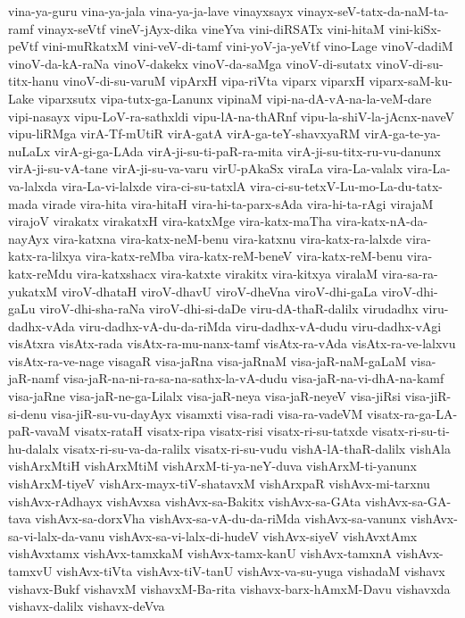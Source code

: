 {vina-ya-guru
vina-ya-jala
vina-ya-ja-lave
vinayxsayx
vinayx-seV-tatx-da-naM-ta-ramf
vinayx-seVtf
vineV-jAyx-dika
vineYva
vini-diRSATx
vini-hitaM
vini-kiSx-peVtf
vini-muRkatxM
vini-veV-di-tamf
vini-yoV-ja-yeVtf
vino-Lage
vinoV-dadiM
vinoV-da-kA-raNa
vinoV-dakekx
vinoV-da-saMga
vinoV-di-sutatx
vinoV-di-su-titx-hanu
vinoV-di-su-varuM
vipArxH
vipa-riVta
viparx
viparxH
viparx-saM-ku-Lake
viparxsutx
vipa-tutx-ga-Lanunx
vipinaM
vipi-na-dA-vA-na-la-veM-dare
vipi-nasayx
vipu-LoV-ra-sathxldi
vipu-lA-na-thARnf
vipu-la-shiV-la-jAcnx-naveV
vipu-liRMga
virA-Tf-mUtiR
virA-gatA
virA-ga-teY-shavxyaRM
virA-ga-te-ya-nuLaLx
virA-gi-ga-LAda
virA-ji-su-ti-paR-ra-mita
virA-ji-su-titx-ru-vu-danunx
virA-ji-su-vA-tane
virA-ji-su-va-varu
virU-pAkaSx
viraLa
vira-La-valalx
vira-La-va-lalxda
vira-La-vi-lalxde
vira-ci-su-tatxlA
vira-ci-su-tetxV-Lu-mo-La-du-tatx-mada
virade
vira-hita
vira-hitaH
vira-hi-ta-parx-sAda
vira-hi-ta-rAgi
virajaM
virajoV
virakatx
virakatxH
vira-katxMge
vira-katx-maTha
vira-katx-nA-da-nayAyx
vira-katxna
vira-katx-neM-benu
vira-katxnu
vira-katx-ra-lalxde
vira-katx-ra-lilxya
vira-katx-reMba
vira-katx-reM-beneV
vira-katx-reM-benu
vira-katx-reMdu
vira-katxshacx
vira-katxte
virakitx
vira-kitxya
viralaM
vira-sa-ra-yukatxM
viroV-dhataH
viroV-dhavU
viroV-dheVna
viroV-dhi-gaLa
viroV-dhi-gaLu
viroV-dhi-sha-raNa
viroV-dhi-si-daDe
viru-dA-thaR-dalilx
virudadhx
viru-dadhx-vAda
viru-dadhx-vA-du-da-riMda
viru-dadhx-vA-dudu
viru-dadhx-vAgi
visAtxra
visAtx-rada
visAtx-ra-mu-nanx-tamf
visAtx-ra-vAda
visAtx-ra-ve-lalxvu
visAtx-ra-ve-nage
visagaR
visa-jaRna
visa-jaRnaM
visa-jaR-naM-gaLaM
visa-jaR-namf
visa-jaR-na-ni-ra-sa-na-sathx-la-vA-dudu
visa-jaR-na-vi-dhA-na-kamf
visa-jaRne
visa-jaR-ne-ga-Lilalx
visa-jaR-neya
visa-jaR-neyeV
visa-jiRsi
visa-jiR-si-denu
visa-jiR-su-vu-dayAyx
visamxti
visa-radi
visa-ra-vadeVM
visatx-ra-ga-LA-paR-vavaM
visatx-rataH
visatx-ripa
visatx-risi
visatx-ri-su-tatxde
visatx-ri-su-ti-hu-dalalx
visatx-ri-su-va-da-ralilx
visatx-ri-su-vudu
vishA-lA-thaR-dalilx
vishAla
vishArxMtiH
vishArxMtiM
vishArxM-ti-ya-neY-duva
vishArxM-ti-yanunx
vishArxM-tiyeV
vishArx-mayx-tiV-shatavxM
vishArxpaR
vishAvx-mi-tarxnu
vishAvx-rAdhayx
vishAvxsa
vishAvx-sa-Bakitx
vishAvx-sa-GAta
vishAvx-sa-GA-tava
vishAvx-sa-dorxVha
vishAvx-sa-vA-du-da-riMda
vishAvx-sa-vanunx
vishAvx-sa-vi-lalx-da-vanu
vishAvx-sa-vi-lalx-di-hudeV
vishAvx-siyeV
vishAvxtAmx
vishAvxtamx
vishAvx-tamxkaM
vishAvx-tamx-kanU
vishAvx-tamxnA
vishAvx-tamxvU
vishAvx-tiVta
vishAvx-tiV-tanU
vishAvx-va-su-yuga
vishadaM
vishavx
vishavx-Bukf
vishavxM
vishavxM-Ba-rita
vishavx-barx-hAmxM-Davu
vishavxda
vishavx-dalilx
vishavx-deVva
}
